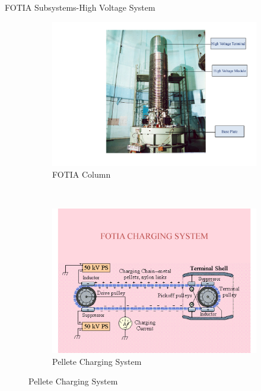 \documentclass[11pt]{beamer}
\begin{document}
\begin{frame}{FOTIA Subsystems-High Voltage System}

  \begin{figure}
        \centering
        \begin{subfigure}[b]{0.5\textwidth}
                \includegraphics[width=\textwidth]{FOTIA_Page_08.jpg}
                \caption{FOTIA Column}
                \label{fig:FOTIA Column}
        \end{subfigure}%
        ~ %
        \begin{subfigure}[b]{0.5\textwidth}
                \includegraphics[width=\textwidth]{FOTIA_Page_10.jpg}
                \caption{Pellete Charging System}
                \label{fig:Charging System}
        \end{subfigure}
       

\end{figure}
\end{frame}
\end{document}

